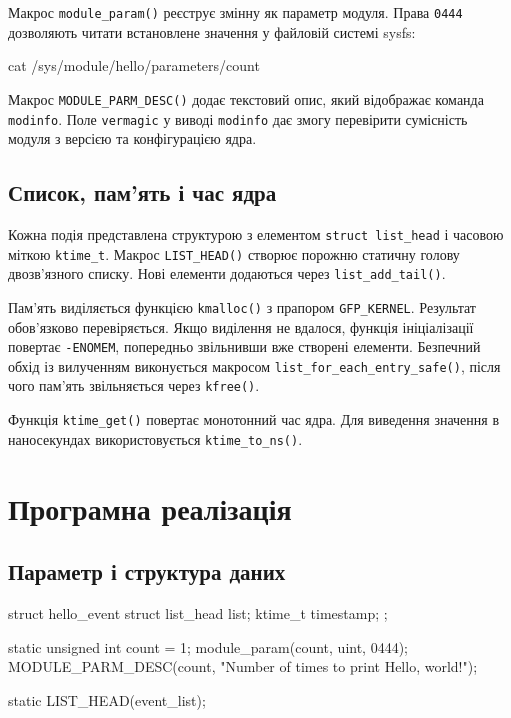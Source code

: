 \documentclass[12pt,a4paper]{article}
\begin{document}
Макрос \texttt{module\_param()} реєструє змінну як параметр модуля.
Права \texttt{0444} дозволяють читати встановлене значення у файловій
системі sysfs:

\begin{code}
cat /sys/module/hello/parameters/count
\end{code}

Макрос \texttt{MODULE\_PARM\_DESC()} додає текстовий опис, який відображає
команда \texttt{modinfo}. Поле \texttt{vermagic} у виводі \texttt{modinfo}
дає змогу перевірити сумісність модуля з версією та конфігурацією ядра.

\subsection{Список, пам'ять і час ядра}

Кожна подія представлена структурою з елементом \texttt{struct list\_head}
і часовою міткою \texttt{ktime\_t}. Макрос \texttt{LIST\_HEAD()} створює
порожню статичну голову двозв'язного списку. Нові елементи додаються через
\texttt{list\_add\_tail()}.

Пам'ять виділяється функцією \texttt{kmalloc()} з прапором
\texttt{GFP\_KERNEL}. Результат обов'язково перевіряється. Якщо виділення
не вдалося, функція ініціалізації повертає \texttt{-ENOMEM}, попередньо
звільнивши вже створені елементи. Безпечний обхід із вилученням виконується
макросом \texttt{list\_for\_each\_entry\_safe()}, після чого пам'ять
звільняється через \texttt{kfree()}.

Функція \texttt{ktime\_get()} повертає монотонний час ядра. Для виведення
значення в наносекундах використовується \texttt{ktime\_to\_ns()}.

\section{Програмна реалізація}

\subsection{Параметр і структура даних}

\begin{code}
struct hello_event {
    struct list_head list;
    ktime_t timestamp;
};

static unsigned int count = 1;
module_param(count, uint, 0444);
MODULE_PARM_DESC(count, "Number of times to print Hello, world!");

static LIST_HEAD(event_list);
\end{code}
\end{document}
